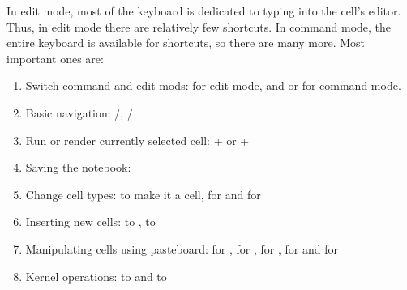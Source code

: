 \documentclass[letterpaper,10pt,english]{sphinxmanual}
\begin{document}
\sphinxAtStartPar
In edit mode, most of the keyboard is dedicated to typing into the cell’s editor. Thus, in edit mode there are relatively few shortcuts. In command mode, the entire keyboard is available for shortcuts, so there are many more. Most important ones are:
\begin{enumerate}
%
\item {} 
\sphinxAtStartPar
Switch command and edit mods:  for edit mode, and  or  for command mode.

\item {} 
\sphinxAtStartPar
Basic navigation: /, /

\item {} 
\sphinxAtStartPar
Run or render currently selected cell: + or +

\item {} 
\sphinxAtStartPar
Saving the notebook: 

\item {} 
\sphinxAtStartPar
Change cell types:  to make it a  cell,  for  and  for 

\item {} 
\sphinxAtStartPar
Inserting new cells:  to ,  to 

\item {} 
\sphinxAtStartPar
Manipulating cells using pasteboard:  for ,  for ,  for ,  for  and  for 

\item {} 
\sphinxAtStartPar
Kernel operations:  to  and  to 

\end{enumerate}
\end{document}
